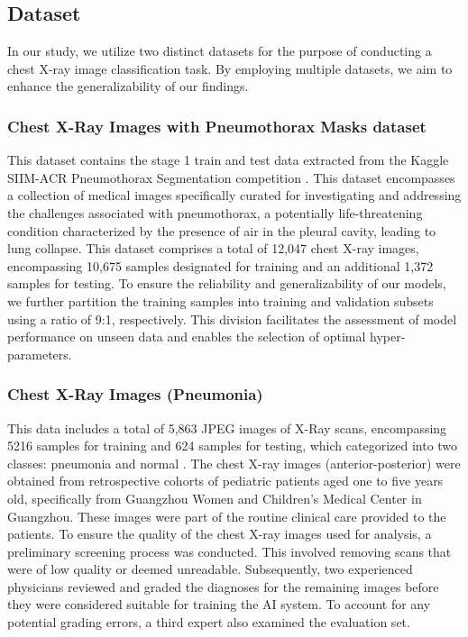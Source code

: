 \subsection{Dataset}
\label{subsec:dataset}

In our study, we utilize two distinct datasets for the purpose of conducting a chest X-ray image classification task. By employing multiple datasets, we aim to enhance the generalizability of our findings.


\subsubsection{Chest X-Ray Images with Pneumothorax Masks dataset}
\label{subsubsec:pneumothorax}
This dataset contains the stage 1 train and test data extracted from the Kaggle SIIM-ACR Pneumothorax Segmentation competition \cite{pneumothorax}. This dataset encompasses a collection of medical images specifically curated for investigating and addressing the challenges associated with pneumothorax, a potentially life-threatening condition characterized by the presence of air in the pleural cavity, leading to lung collapse. This dataset comprises a total of 12,047 chest X-ray images, encompassing 10,675 samples designated for training and an additional 1,372 samples for testing. To ensure the reliability and generalizability of our models, we further partition the training samples into training and validation subsets using a ratio of 9:1, respectively. This division facilitates the assessment of model performance on unseen data and enables the selection of optimal hyper-parameters.

\subsubsection{Chest X-Ray Images (Pneumonia)}
\label{subsubsec:pneumonia}
This data includes a total of 5,863 JPEG images of X-Ray scans, encompassing 5216 samples for training and 624 samples for testing, which categorized into two classes: pneumonia and normal \cite{penumonia}. The chest X-ray images (anterior-posterior) were obtained from retrospective cohorts of pediatric patients aged one to five years old, specifically from Guangzhou Women and Children’s Medical Center in Guangzhou. These images were part of the routine clinical care provided to the patients. To ensure the quality of the chest X-ray images used for analysis, a preliminary screening process was conducted. This involved removing scans that were of low quality or deemed unreadable. Subsequently, two experienced physicians reviewed and graded the diagnoses for the remaining images before they were considered suitable for training the AI system. To account for any potential grading errors, a third expert also examined the evaluation set.
